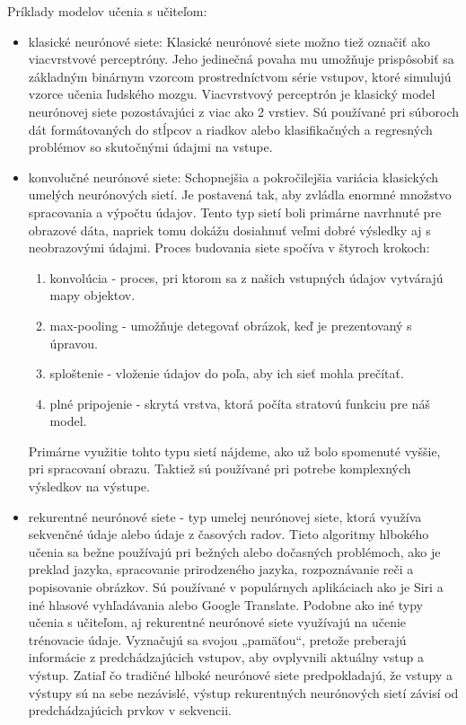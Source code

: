 Príklady modelov učenia s učiteľom:
\begin{itemize}
  \item klasické neurónové siete: Klasické neurónové siete možno tiež označiť ako viacvrstvové perceptróny. Jeho jedinečná povaha mu umožňuje prispôsobiť sa základným binárnym vzorcom prostredníctvom série vstupov, ktoré simulujú vzorce učenia ľudského mozgu. Viacvrstvový perceptrón je klasický model neurónovej siete pozostávajúci z viac ako 2 vrstiev. Sú používané pri súboroch dát formátovaných do stĺpcov a riadkov alebo klasifikačných a regresných problémov so skutočnými údajmi na vstupe.
  \item konvolučné neurónové siete: Schopnejšia a pokročilejšia variácia klasických umelých neurónových sietí. Je postavená tak, aby zvládla enormné množstvo spracovania a výpočtu údajov. Tento typ sietí boli primárne navrhnuté pre obrazové dáta, napriek tomu dokážu dosiahnuť veľmi dobré výsledky aj s neobrazovými údajmi. Proces budovania siete spočíva v štyroch krokoch: 
  \begin{enumerate}
      \item konvolúcia - proces, pri ktorom sa z našich vstupných údajov vytvárajú mapy objektov.
      \item max-pooling - umožňuje detegovať obrázok, keď je prezentovaný s úpravou.
      \item sploštenie - vloženie údajov do poľa, aby ich sieť mohla prečítať.
      \item plné pripojenie - skrytá vrstva, ktorá počíta stratovú funkciu pre náš model.
  \end{enumerate}
  Primárne využitie tohto typu sietí nájdeme, ako už bolo spomenuté vyššie, pri spracovaní obrazu. Taktiež sú používané pri potrebe komplexných výsledkov na výstupe.
  \item rekurentné neurónové siete - typ umelej neurónovej siete, ktorá využíva sekvenčné údaje alebo údaje z časových radov. Tieto algoritmy hlbokého učenia sa bežne používajú pri bežných alebo dočasných problémoch, ako je preklad jazyka, spracovanie prirodzeného jazyka, rozpoznávanie reči a popisovanie obrázkov. Sú používané v populárnych aplikáciach ako je Siri a iné hlasové vyhľadávania alebo Google Translate. Podobne ako iné typy učenia s učiteľom, aj rekurentné neurónové siete využívajú na učenie trénovacie údaje. Vyznačujú sa svojou „pamäťou“, pretože preberajú informácie z predchádzajúcich vstupov, aby ovplyvnili aktuálny vstup a výstup. Zatiaľ čo tradičné hlboké neurónové siete predpokladajú, že vstupy a výstupy sú na sebe nezávislé, výstup rekurentných neurónových sietí závisí od predchádzajúcich prvkov v sekvencii.
\end{itemize}


